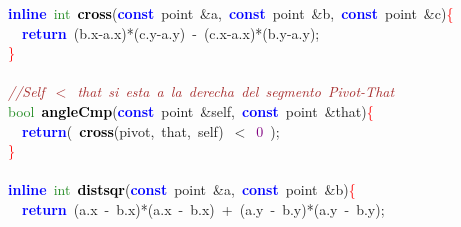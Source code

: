 {{\mbox{}\textbf{\textcolor{Blue}{inline}}\ \textcolor{ForestGreen}{int}\ \textbf{\textcolor{Black}{cross}}\textcolor{BrickRed}{(}\textbf{\textcolor{Blue}{const}}\ point\ \textcolor{BrickRed}{\&}a\textcolor{BrickRed}{,}\ \textbf{\textcolor{Blue}{const}}\ point\ \textcolor{BrickRed}{\&}b\textcolor{BrickRed}{,}\ \textbf{\textcolor{Blue}{const}}\ point\ \textcolor{BrickRed}{\&}c\textcolor{BrickRed}{)}\textcolor{Red}{\{} \\
\mbox{}\ \ \textbf{\textcolor{Blue}{return}}\ \textcolor{BrickRed}{(}b\textcolor{BrickRed}{.}x\textcolor{BrickRed}{-}a\textcolor{BrickRed}{.}x\textcolor{BrickRed}{)*(}c\textcolor{BrickRed}{.}y\textcolor{BrickRed}{-}a\textcolor{BrickRed}{.}y\textcolor{BrickRed}{)}\ \textcolor{BrickRed}{-}\ \textcolor{BrickRed}{(}c\textcolor{BrickRed}{.}x\textcolor{BrickRed}{-}a\textcolor{BrickRed}{.}x\textcolor{BrickRed}{)*(}b\textcolor{BrickRed}{.}y\textcolor{BrickRed}{-}a\textcolor{BrickRed}{.}y\textcolor{BrickRed}{);} \\
\mbox{}\textcolor{Red}{\}} \\
\mbox{} \\
\mbox{}\textit{\textcolor{Brown}{//Self\ $<$\ that\ si\ esta\ a\ la\ derecha\ del\ segmento\ Pivot-That}} \\
\mbox{}\textcolor{ForestGreen}{bool}\ \textbf{\textcolor{Black}{angleCmp}}\textcolor{BrickRed}{(}\textbf{\textcolor{Blue}{const}}\ point\ \textcolor{BrickRed}{\&}self\textcolor{BrickRed}{,}\ \textbf{\textcolor{Blue}{const}}\ point\ \textcolor{BrickRed}{\&}that\textcolor{BrickRed}{)}\textcolor{Red}{\{} \\
\mbox{}\ \ \textbf{\textcolor{Blue}{return}}\textcolor{BrickRed}{(}\ \textbf{\textcolor{Black}{cross}}\textcolor{BrickRed}{(}pivot\textcolor{BrickRed}{,}\ that\textcolor{BrickRed}{,}\ self\textcolor{BrickRed}{)}\ \textcolor{BrickRed}{$<$}\ \textcolor{Purple}{0}\ \textcolor{BrickRed}{);} \\
\mbox{}\textcolor{Red}{\}} \\
\mbox{} \\
\mbox{}\textbf{\textcolor{Blue}{inline}}\ \textcolor{ForestGreen}{int}\ \textbf{\textcolor{Black}{distsqr}}\textcolor{BrickRed}{(}\textbf{\textcolor{Blue}{const}}\ point\ \textcolor{BrickRed}{\&}a\textcolor{BrickRed}{,}\ \textbf{\textcolor{Blue}{const}}\ point\ \textcolor{BrickRed}{\&}b\textcolor{BrickRed}{)}\textcolor{Red}{\{} \\
\mbox{}\ \ \textbf{\textcolor{Blue}{return}}\ \textcolor{BrickRed}{(}a\textcolor{BrickRed}{.}x\ \textcolor{BrickRed}{-}\ b\textcolor{BrickRed}{.}x\textcolor{BrickRed}{)*(}a\textcolor{BrickRed}{.}x\ \textcolor{BrickRed}{-}\ b\textcolor{BrickRed}{.}x\textcolor{BrickRed}{)}\ \textcolor{BrickRed}{+}\ \textcolor{BrickRed}{(}a\textcolor{BrickRed}{.}y\ \textcolor{BrickRed}{-}\ b\textcolor{BrickRed}{.}y\textcolor{BrickRed}{)*(}a\textcolor{BrickRed}{.}y\ \textcolor{BrickRed}{-}\ b\textcolor{BrickRed}{.}y\textcolor{BrickRed}{);} \\
}}
